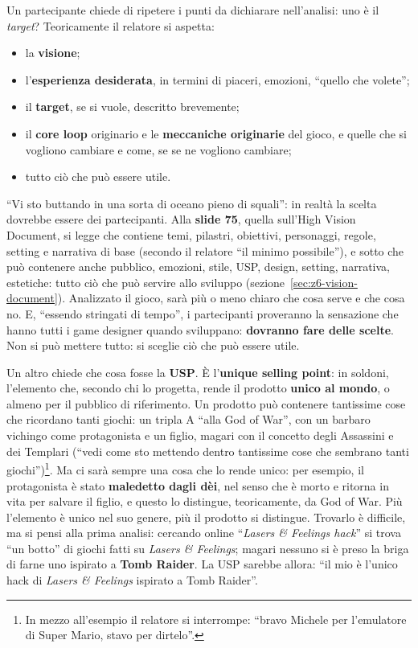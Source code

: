 Un partecipante chiede di ripetere i punti da dichiarare nell'analisi: uno è il
\emph{target}? Teoricamente il relatore si aspetta:
\begin{itemize}
  \item la \textbf{visione};
  \item l'\textbf{esperienza desiderata}, in termini di piaceri, emozioni,
        ``quello che volete'';
  \item il \textbf{target}, se si vuole, descritto brevemente;
  \item il \textbf{core loop} originario e le \textbf{meccaniche originarie} del
        gioco, e quelle che si vogliono cambiare e come, se se ne vogliono
        cambiare;
  \item tutto ciò che può essere utile.
\end{itemize}
``Vi sto buttando in una sorta di oceano pieno di squali'': in realtà la scelta
dovrebbe essere dei partecipanti. Alla \textbf{slide 75}, quella sull'High
Vision Document, si legge che contiene temi, pilastri, obiettivi, personaggi,
regole, setting e narrativa di base (secondo il relatore ``il minimo
possibile''), e sotto che può contenere anche pubblico, emozioni, stile, USP,
design, setting, narrativa, estetiche: tutto ciò che può servire allo sviluppo
(sezione~\ref{sec:z6-vision-document}). Analizzato il gioco, sarà più o meno
chiaro che cosa serve e che cosa no. E, ``essendo stringati di tempo'', i
partecipanti proveranno la sensazione che hanno tutti i game designer quando
sviluppano: \textbf{dovranno fare delle scelte}. Non si può mettere tutto: si
sceglie ciò che può essere utile.

Un altro chiede che cosa fosse la \textbf{USP}. È l'\textbf{unique selling
point}: in soldoni, l'elemento che, secondo chi lo progetta, rende il prodotto
\textbf{unico al mondo}, o almeno per il pubblico di riferimento. Un prodotto
può contenere tantissime cose che ricordano tanti giochi: un tripla A ``alla God
of War'', con un barbaro vichingo come protagonista e un figlio, magari con il
concetto degli Assassini e dei Templari (``vedi come sto mettendo dentro
tantissime cose che sembrano tanti giochi'')\footnote{In mezzo all'esempio il
relatore si interrompe: ``bravo Michele per l'emulatore di Super Mario, stavo per
dirtelo''.}. Ma ci sarà sempre una cosa che lo rende unico: per esempio, il
protagonista è stato \textbf{maledetto dagli dèi}, nel senso che è morto e
ritorna in vita per salvare il figlio, e questo lo distingue, teoricamente, da
God of War. Più l'elemento è unico nel suo genere, più il prodotto si distingue.
Trovarlo è difficile, ma si pensi alla prima analisi: cercando online
``\emph{Lasers \& Feelings hack}'' si trova ``un botto'' di giochi fatti su
\emph{Lasers \& Feelings}; magari nessuno si è preso la briga di farne uno
ispirato a \textbf{Tomb Raider}. La USP sarebbe allora: ``il mio è l'unico hack di
\emph{Lasers \& Feelings} ispirato a Tomb Raider''.

